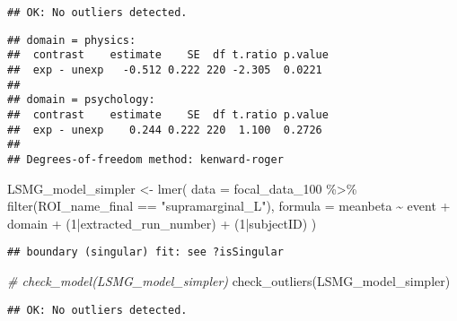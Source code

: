 \documentclass[
]{article}
\newenvironment{Shaded}{\begin{snugshade}}{\end{snugshade}}
\newcommand{\AttributeTok}[1]{\textcolor[rgb]{0.77,0.63,0.00}{#1}}
\newcommand{\CommentTok}[1]{\textcolor[rgb]{0.56,0.35,0.01}{\textit{#1}}}
\newcommand{\DecValTok}[1]{\textcolor[rgb]{0.00,0.00,0.81}{#1}}
\newcommand{\FunctionTok}[1]{\textcolor[rgb]{0.00,0.00,0.00}{#1}}
\newcommand{\NormalTok}[1]{#1}
\newcommand{\OtherTok}[1]{\textcolor[rgb]{0.56,0.35,0.01}{#1}}
\newcommand{\SpecialCharTok}[1]{\textcolor[rgb]{0.00,0.00,0.00}{#1}}
\newcommand{\StringTok}[1]{\textcolor[rgb]{0.31,0.60,0.02}{#1}}
\begin{document}
\begin{verbatim}
## OK: No outliers detected.
\end{verbatim}

\begin{Shaded}
\end{Shaded}

\begin{verbatim}
## domain = physics:
##  contrast    estimate    SE  df t.ratio p.value
##  exp - unexp   -0.512 0.222 220 -2.305  0.0221 
## 
## domain = psychology:
##  contrast    estimate    SE  df t.ratio p.value
##  exp - unexp    0.244 0.222 220  1.100  0.2726 
## 
## Degrees-of-freedom method: kenward-roger
\end{verbatim}

\begin{Shaded}
\begin{Highlighting}[]
\NormalTok{LSMG\_model\_simpler }\OtherTok{\textless{}{-}} \FunctionTok{lmer}\NormalTok{(}
      \AttributeTok{data =}\NormalTok{ focal\_data\_100 }\SpecialCharTok{\%\textgreater{}\%} \FunctionTok{filter}\NormalTok{(ROI\_name\_final }\SpecialCharTok{==} \StringTok{"supramarginal\_L"}\NormalTok{),}
      \AttributeTok{formula =}\NormalTok{ meanbeta }\SpecialCharTok{\textasciitilde{}}\NormalTok{ event }\SpecialCharTok{+}\NormalTok{ domain }\SpecialCharTok{+}\NormalTok{ (}\DecValTok{1}\SpecialCharTok{|}\NormalTok{extracted\_run\_number) }\SpecialCharTok{+}\NormalTok{ (}\DecValTok{1}\SpecialCharTok{|}\NormalTok{subjectID)}
\NormalTok{    )}
\end{Highlighting}
\end{Shaded}

\begin{verbatim}
## boundary (singular) fit: see ?isSingular
\end{verbatim}

\begin{Shaded}
\begin{Highlighting}[]
\CommentTok{\# check\_model(LSMG\_model\_simpler)}
\FunctionTok{check\_outliers}\NormalTok{(LSMG\_model\_simpler)}
\end{Highlighting}
\end{Shaded}

\begin{verbatim}
## OK: No outliers detected.
\end{verbatim}
\end{document}
